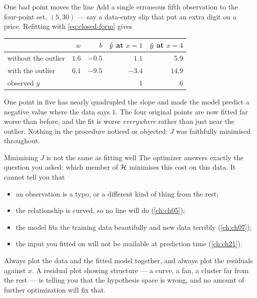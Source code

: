 \begin{workedexample}{One bad point moves the line}
Add a single erroneous fifth observation to the four-point set, $(5, 30)$ ---
say a data-entry slip that put an extra digit on a price. Refitting with
\cref{eq:closed-form} gives

\begin{center}
\small
\begin{tabular}{@{}lrrrr@{}}
\toprule
& $w$ & $b$ & $\hat{y}$ at $x=1$ & $\hat{y}$ at $x=4$\\
\midrule
without the outlier & $1.6$ & $-0.5$ & $1.1$  & $5.9$\\
with the outlier    & $6.1$ & $-9.5$ & $-3.4$ & $14.9$\\
\midrule
observed $y$        &       &        & $1$    & $6$\\
\bottomrule
\end{tabular}
\end{center}

One point in five has nearly quadrupled the slope and made the model predict a
negative value where the data says $1$. The four original points are now fitted
far worse than before, and the fit is worse \emph{everywhere} rather than just
near the outlier. Nothing in the procedure noticed or objected: $J$ was
faithfully minimised throughout.
\end{workedexample}

\begin{pitfall}{Minimising $J$ is not the same as fitting well}
The optimizer answers exactly the question you asked: which member of
$\mathcal{H}$ minimises this cost on this data. It cannot tell you that
\begin{itemize}
  \item an observation is a typo, or a different kind of thing from the rest;
  \item the relationship is curved, so no line will do (\cref{ch:ch05});
  \item the model fits the training data beautifully and new data terribly
        (\cref{ch:ch07});
  \item the input you fitted on will not be available at prediction time
        (\cref{ch:ch21}).
\end{itemize}
Always plot the data and the fitted model together, and always plot the
residuals against $x$. A residual plot showing structure --- a curve, a fan, a
cluster far from the rest --- is telling you that the hypothesis space is wrong,
and no amount of further optimization will fix that.
\end{pitfall}

